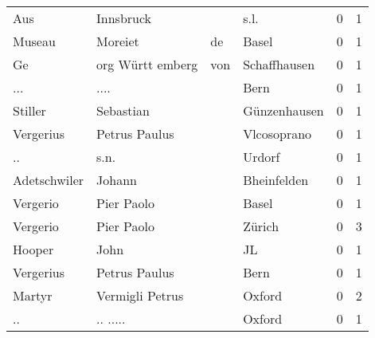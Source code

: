\begin{tabular}{llllrr}
                      Aus &                          Innsbruck &             &                                        s.l. &          0 &         1 \\
                   Museau &                            Moreiet &          de &                                       Basel &          0 &         1 \\
                       Ge &                  org  Württ emberg &         von &                                Schaffhausen &          0 &         1 \\
                      ... &                               .... &             &                                        Bern &          0 &         1 \\
                  Stiller &                          Sebastian &             &                                Günzenhausen &          0 &         1 \\
                Vergerius &                      Petrus Paulus &             &                                 Vlcosoprano &          0 &         1 \\
                       .. &                               s.n. &             &                                      Urdorf &          0 &         1 \\
             Adetschwiler &                             Johann &             &                                 Bheinfelden &          0 &         1 \\
                 Vergerio &                         Pier Paolo &             &                                       Basel &          0 &         1 \\
                 Vergerio &                         Pier Paolo &             &                                      Zürich &          0 &         3 \\
                   Hooper &                               John &             &                                          JL &          0 &         1 \\
                Vergerius &                      Petrus Paulus &             &                                        Bern &          0 &         1 \\
                   Martyr &                    Vermigli Petrus &             &                                      Oxford &          0 &         2 \\
                       .. &                           .. ..... &             &                                      Oxford &          0 &         1 \\

\end{tabular}
